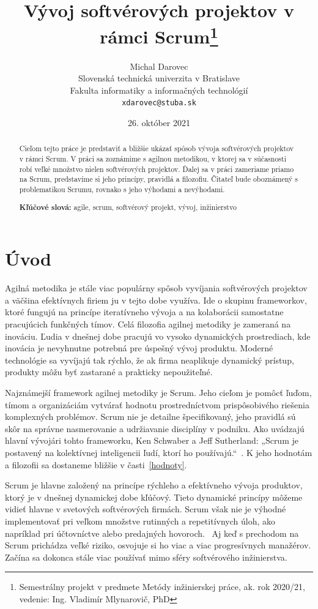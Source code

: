 \documentclass[10pt,slovak,a4paper]{article}
\title{Vývoj softvérových projektov v rámci Scrum\thanks{Semestrálny projekt v predmete Metódy inžinierskej práce, ak. rok 2020/21, vedenie: Ing. Vladimír Mlynarovič, PhD}}
\author{Michal Darovec\\[2pt]
	{\small Slovenská technická univerzita v Bratislave}\\
	{\small Fakulta informatiky a informačných technológií}\\
	{\small \texttt{xdarovec@stuba.sk}}
	}
\date{\small 26. október 2021}
\begin{document}
\maketitle

\begin{abstract}
Cieľom tejto práce je predstaviť a bližšie ukázať spôsob vývoja softvérových projektov v rámci Scrum. V práci sa zoznámime s agilnou metodikou, v ktorej sa v súčasnosti robí veľké množstvo nielen softvérových projektov. Ďalej sa v práci zameriame priamo na Scrum, predstavíme si jeho princípy, pravidlá a filozofiu. Čitateľ bude oboznámený s problematikou Scrumu, rovnako s jeho výhodami a nevýhodami.

\textbf{Kľúčové slová:} agile, scrum, softvérový projekt, vývoj, inžinierstvo
\end{abstract}



\section{Úvod}

Agilná metodika je stále viac populárny spôsob vyvíjania softvérových projektov a väčšina efektívnych firiem ju v tejto dobe využíva. Ide o skupinu frameworkov, ktoré fungujú na princípe iteratívneho vývoja a na kolaborácii samostatne pracujúcich funkčných tímov.
Celá filozofia agilnej metodiky je zameraná na inováciu. Ľudia v dnešnej dobe pracujú vo vysoko dynamických prostrediach, kde inovácia je nevyhnutne potrebná pre úspešný vývoj produktu. Moderné technológie sa vyvíjajú tak rýchlo, že ak firma neaplikuje dynamický prístup, produkty môžu byť zastarané a prakticky nepoužiteľné.

Najznámejší framework agilnej metodiky je Scrum. Jeho cieľom je pomôcť ľuďom, tímom a organizáciám vytvárať hodnotu prostredníctvom prispôsobivého riešenia komplexných problémov. Scrum nie je detailne špecifikovaný, jeho pravidlá sú skôr na správne nasmerovanie a udržiavanie disciplíny v podniku. Ako uvádzajú hlavní vývojári tohto frameworku, Ken Schwaber a Jeff Sutherland: „Scrum je postavený na kolektívnej inteligencii ľudí, ktorí ho používajú.“~\cite{schwaber2020scrum}. K jeho hodnotám a filozofii sa dostaneme bližšie v časti~\ref{hodnoty}.

Scrum je hlavne založený na princípe rýchleho a efektívneho vývoja produktov, ktorý je v dnešnej dynamickej dobe kľúčový. Tieto dynamické princípy môžeme vidieť hlavne v svetových softvérových firmách. Scrum však nie je výhodné implementovať pri veľkom množstve rutinných a repetitívnych úloh, ako napríklad pri účtovníctve alebo predajných hovoroch.~\cite{agile} Aj keď s prechodom na Scrum prichádza veľké riziko, osvojuje si ho viac a viac progresívnych manažérov. Začína sa dokonca stále viac používať mimo sféry softvérového inžinierstva.
\end{document}
